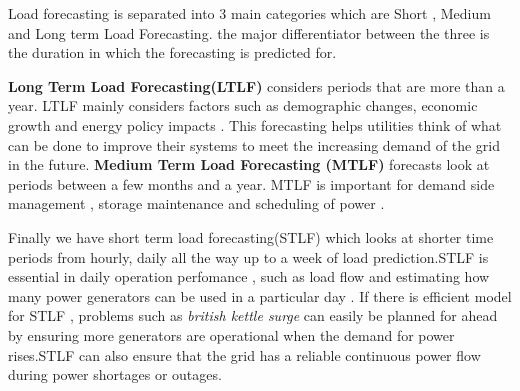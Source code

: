 Load forecasting is separated into 3 main categories which are Short , Medium and Long term Load Forecasting. the major differentiator between the three is the duration in which the forecasting is predicted for.

\textbf{Long Term Load Forecasting(LTLF)} considers periods that are more than a year. LTLF mainly considers factors such as demographic changes, economic growth and energy policy impacts \cite{IBM_loadforecasting}. This forecasting helps utilities think of what can be done to improve their systems to meet the increasing demand of the grid in the future.
\textbf{Medium Term Load Forecasting (MTLF)} forecasts look at periods between a few months and a year. MTLF is important for demand side management  , storage maintenance and scheduling of power \cite{han2018enhanced}.

Finally we have short term load forecasting(STLF) which looks at shorter time periods from hourly, daily all the way up to a week of load prediction.STLF is essential in daily operation perfomance , such as load flow and estimating how many power generators can be used in a particular day \cite{shohan2022forecasting}. If there is efficient model for STLF  , problems such as \textit{british kettle surge} can easily be planned for ahead by ensuring more generators are operational when the demand for power rises.STLF can also ensure that the grid has a reliable continuous power flow during power shortages or outages\cite{tarmanini2023short}.
 

